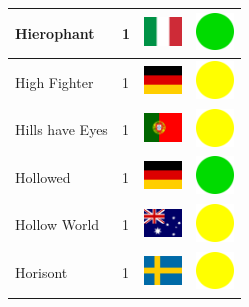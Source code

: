 \documentclass[12pt, a4paper, twoside]{report}
\begin{document}
\begin{center}
\begin{longtable}{|p{5cm}|p{2cm}|p{2cm}|p{2cm}|}
			Hierophant & 1 & \includegraphics[width=1cm]{4x3/it} & \includegraphics[width=1cm]{likes/y} \\ \hline
			High Fighter & 1 & \includegraphics[width=1cm]{4x3/de} & \includegraphics[width=1cm]{likes/m} \\ \hline
			Hills have Eyes & 1 & \includegraphics[width=1cm]{4x3/pt} & \includegraphics[width=1cm]{likes/m} \\ \hline
			Hollowed & 1 & \includegraphics[width=1cm]{4x3/de} & \includegraphics[width=1cm]{likes/y} \\ \hline
			Hollow World & 1 & \includegraphics[width=1cm]{4x3/au} & \includegraphics[width=1cm]{likes/m} \\ \hline
			Horisont & 1 & \includegraphics[width=1cm]{4x3/se} & \includegraphics[width=1cm]{likes/m} \\ \hline

\end{longtable}
\end{center}
\end{document}
